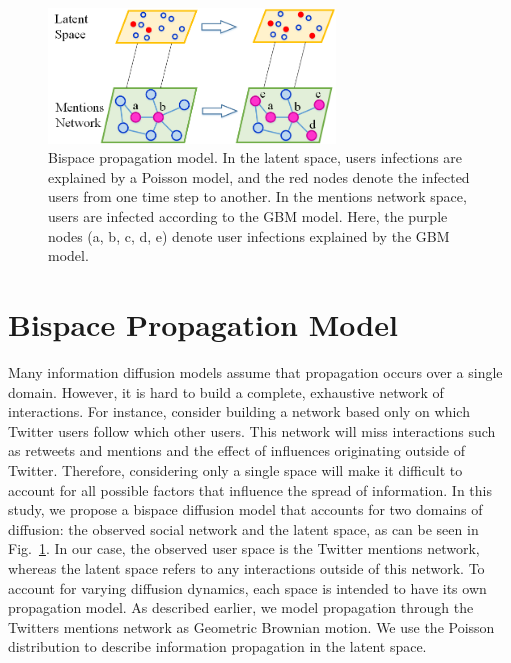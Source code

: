 
\begin{figure}[Ht]
\centering
\includegraphics[width=3in] {figures/Bio-space.png}
\caption{Bispace propagation model. In the latent space, users infections
are explained by a Poisson model, and the red nodes denote the infected users
from one time step to another.
In the mentions network space, users are infected according to the
GBM model. Here, the purple nodes (a, b, c, d, e) denote
user infections explained by the GBM model. }
\label{fig:bi-space}
\end{figure}

\section{Bispace Propagation Model}
Many information diffusion models assume that propagation occurs over a single domain.
However, it is hard to build a complete, exhaustive network of interactions.
For instance, consider building a network based only on which Twitter users follow which other users. This network will miss interactions such as retweets and mentions and the effect of influences originating
outside of Twitter. Therefore, considering only a single space will make it difficult to account for all possible factors that influence the spread of information.
In this study, we propose a bispace diffusion model that accounts for two domains of diffusion: the observed social network and the latent space, as can be seen in Fig.~\ref{fig:bi-space}.
In our case, the observed user space is the Twitter mentions network,
whereas the latent space refers to any interactions outside of this network.
To account for varying diffusion dynamics, each space is intended to have
its own propagation model.
As described earlier, we model propagation through the Twitters mentions network as Geometric Brownian motion. We use the Poisson distribution to describe information propagation in the latent space.

